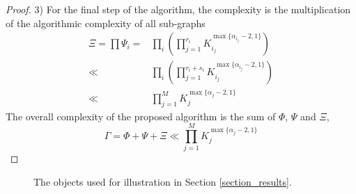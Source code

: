 \documentclass[journal]{IEEEtran}
\begin{document}
\begin{proof}
3) For the final step of the algorithm, the complexity is the multiplication of the algorithmic complexity of all sub-graphs 
\begin{equation}
\begin{aligned}
\Xi = \prod \Psi_i = & \prod\limits_i \left(\prod\limits_{j = 1}^{r_i} K_{i_j}^{\max\{\alpha_{i_j}-2, 1\}}\right)\\
\ll&  \prod\limits_i \left(\prod\limits_{j = 1}^{r_i+s_i} K_{i_j}^{\max\{\alpha_{i_j}-2, 1\}}\right)\\
\ll& \prod\limits_{j = 1}^M K_j^{\max\{\alpha_j-2, 1\}}
\end{aligned}
\end{equation}
The overall complexity of the proposed algorithm is the sum of $\Phi$, $\Psi$ and $\Xi$, 
\begin{equation}
\Gamma =\Phi+\Psi+\Xi \ll  \prod\limits_{j = 1}^M K_j^{\max\{\alpha_j-2, 1\}}
\end{equation}
\end{proof}

\begin{figure}[t]
\centering
{}
\caption{The objects used for illustration in Section \ref{section_results}. }\label{fig:object}
\end{figure}
\end{document}
